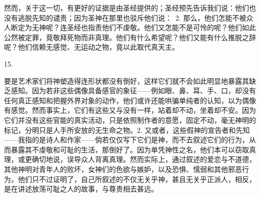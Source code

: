 \par

然而，关于这一切，有更好的证据是由圣经提供的；圣经预先告诉我们说：他们也没有逃脱先知的谴责；因为圣神在那里也驳斥他们说：\ 2. 那么，他们怎能不被众人断定为无神呢？连圣经也指责他们不虔敬。他们又怎能不是可怜的呢？他们如此公然被定罪，竟敬拜死物而非真理。他们有什么希望呢？他们又能有什么推脱之辞呢？他们信赖无感觉、无运动之物，竟以此取代真天主。\par

15. \par

要是艺术家们将神塑造得连形状都没有倒好，这样它们就不会如此明显地暴露其缺乏感知。因为若非这些偶像具备感官的象征——例如眼、鼻、耳、手、口，却没有任何真正感知和把握外界对象的动作，他们或许还能哄骗单纯者的认知，以为偶像有感觉。然而事实上，它们有这些又与没有一样，站着却不动，坐着却不安。因为它们并没有这些官能的真实活动，只是依照制作者的意愿，固定不动，毫无神明的标记，分明只是人手所安放的无生命之物。2. 又或者，这些假神的宣告者和先知——我指的是诗人和作家——倘若仅仅写下它们是神，而不去叙述它们的行为，从而暴露其不虔敬和可耻的生活，那倒好了。因为单凭神性之名，他们本可以窃取真理，或更确切地说，误导众人背离真理。然而实际上，通过叙述的爱恋与不道德，其他神明对青年人的败坏，女神们的色欲与嫉妒，以及恐惧、懦弱和其他邪恶行为，他们只不过证明了，自己所叙述的不仅无关乎神，甚且无关乎正派人，相反，是在讲述放荡可耻之人的故事，与尊贵相去甚远。\par

